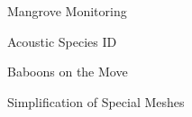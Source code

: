 \item Mangrove Monitoring
\item Acoustic Species ID
\item Baboons on the Move
\item Simplification of Special Meshes
